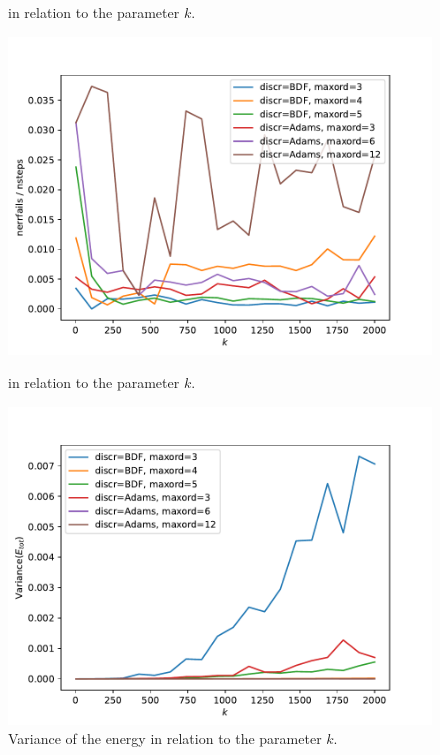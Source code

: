 \documentclass{report}
\begin{document}
\begin{figure}[h]
\begin{minipage}[b]{0.45\textwidth}
\caption{ in relation to the parameter $k$.}
\label{pl:njacs_nsteps1}
\end{minipage}
\end{figure}


\begin{figure}[h]
\centering
\begin{minipage}[b]{0.45\textwidth}
\centering
\includegraphics[width=\textwidth]{../Plots/Task4/Figure_212}
\caption{ in relation to the parameter $k$.}
\label{pl:nerrfails_nsteps1}
\end{minipage}
\hfill
\begin{minipage}[b]{0.45\textwidth}
\centering
\includegraphics[width=\textwidth]{../Plots/Task4/Figure_204}
\caption{Variance of the energy in relation to the parameter $k$.}
\label{pl:stability1}
\end{minipage}
\end{figure}
\end{document}
